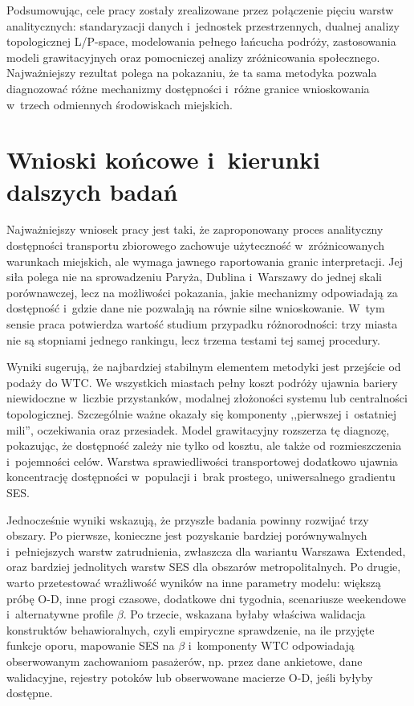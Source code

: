 \documentclass{pracamgr}
\begin{document}
Podsumowując, cele pracy zostały zrealizowane przez połączenie pięciu warstw analitycznych: standaryzacji danych i~jednostek przestrzennych, dualnej analizy topologicznej \mbox{L/P-space}, modelowania pełnego łańcucha podróży, zastosowania modeli grawitacyjnych oraz pomocniczej analizy zróżnicowania społecznego. Najważniejszy rezultat polega na pokazaniu, że ta sama metodyka pozwala diagnozować różne mechanizmy dostępności i~różne granice wnioskowania w~trzech odmiennych środowiskach miejskich.

\section{Wnioski końcowe i~kierunki dalszych badań}\label{section:ch5_wnioski_koncowe}

Najważniejszy wniosek pracy jest taki, że zaproponowany proces analityczny dostępności transportu zbiorowego zachowuje użyteczność w~zróżnicowanych warunkach miejskich, ale wymaga jawnego raportowania granic interpretacji. Jej siła polega nie na sprowadzeniu Paryża, Dublina i~Warszawy do jednej skali porównawczej, lecz na możliwości pokazania, jakie mechanizmy odpowiadają za dostępność i~gdzie dane nie pozwalają na równie silne wnioskowanie. W~tym sensie praca potwierdza wartość studium przypadku różnorodności: trzy miasta nie są stopniami jednego rankingu, lecz trzema testami tej samej procedury.

Wyniki sugerują, że najbardziej stabilnym elementem metodyki jest przejście od podaży do \mbox{WTC}. We wszystkich miastach pełny koszt podróży ujawnia bariery niewidoczne w~liczbie przystanków, modalnej złożoności systemu lub centralności topologicznej. Szczególnie ważne okazały się komponenty ,,pierwszej i~ostatniej mili'', oczekiwania oraz przesiadek. Model grawitacyjny rozszerza tę diagnozę, pokazując, że dostępność zależy nie tylko od kosztu, ale także od rozmieszczenia i~pojemności celów. Warstwa sprawiedliwości transportowej dodatkowo ujawnia koncentrację dostępności w~populacji i~brak prostego, uniwersalnego gradientu \mbox{SES}.

Jednocześnie wyniki wskazują, że przyszłe badania powinny rozwijać trzy obszary. Po pierwsze, konieczne jest pozyskanie bardziej porównywalnych i~pełniejszych warstw zatrudnienia, zwłaszcza dla wariantu \mbox{Warszawa~Extended}, oraz bardziej jednolitych warstw \mbox{SES} dla obszarów metropolitalnych. Po drugie, warto przetestować wrażliwość wyników na inne parametry modelu: większą próbę \mbox{O-D}, inne progi czasowe, dodatkowe dni tygodnia, scenariusze weekendowe i~alternatywne profile $\beta$. Po trzecie, wskazana byłaby właściwa walidacja konstruktów behawioralnych, czyli empiryczne sprawdzenie, na ile przyjęte funkcje oporu, mapowanie \mbox{SES} na $\beta$ i~komponenty \mbox{WTC} odpowiadają obserwowanym zachowaniom pasażerów, np. przez dane ankietowe, dane walidacyjne, rejestry potoków lub obserwowane macierze \mbox{O-D}, jeśli byłyby dostępne.
\end{document}

